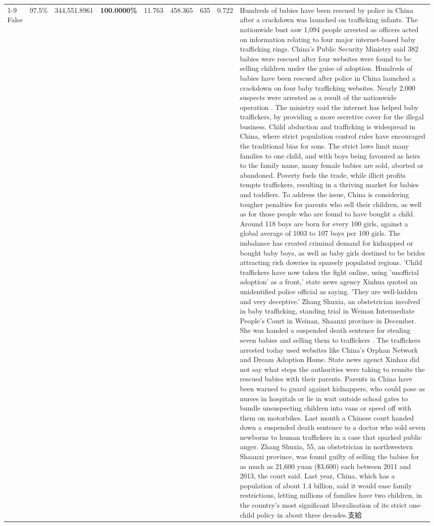 \begin{table}[H]
\begin{tabular}{lllrlllll}
\cline{1-9}
False & 97.5\% & 344,551.8961 & \bfseries \color{red} 100.0000\% & 11.763 & 458.365 & 635 & 0.722 & Hundreds of babies have been rescued by police in China after a crackdown was launched on trafficking infants. The nationwide bust saw 1,094 people arrested as officers acted on information relating to four major internet-based baby trafficking rings. China's Public Security Ministry said 382 babies were rescued after four websites were found to be selling children under the guise of adoption. Hundreds of babies have been rescued after police in China launched a crackdown on four baby trafficking websites. Nearly 2,000 suspects were arrested as a result of the nationwide operation . The ministry said the internet has helped baby traffickers, by providing a more secretive cover for the illegal business. Child abduction and trafficking is widespread in China, where strict population control rules have encouraged the traditional bias for sons. The strict laws limit many families to one child, and with boys being favoured as heirs to the family name, many female babies are sold, aborted or abandoned. Poverty fuels the trade, while illicit profits tempts traffickers, resulting in a thriving market for babies and toddlers. To address the issue, China is considering tougher penalties for parents who sell their children, as well as for those people who are found to have bought a child. Around 118 boys are born for every 100 girls, against a global average of 1003 to 107 boys per 100 girls. The imbalance has created criminal demand for kidnapped or bought baby boys, as well as baby girls destined to be brides attracting rich dowries in sparsely populated regions. 'Child traffickers have now taken the fight online, using 'unofficial adoption' as a front,' state news agency Xinhua quoted an unidentified police official as saying. 'They are well-hidden and very deceptive.' Zhang Shuxia, an obstetrician involved in baby trafficking, standing trial in Weinan Intermediate People's Court in Weinan, Shaanxi province in December. She was handed a suspended death sentence for stealing seven babies and selling them to traffickers . The traffickers arrested today used websites like China's Orphan Network and Dream Adoption Home. State news agenct Xinhau did not say what steps the authorities were taking to reunite the rescued babies with their parents. Parents in China have been warned to guard against kidnappers, who could pose as nurses in hospitals or lie in wait outside school gates to bundle unsuspecting children into vans or speed off with them on motorbikes. Last month a Chinese court handed down a suspended death sentence to a doctor who sold seven newborns to human traffickers in a case that sparked public anger. Zhang Shuxia, 55, an obstetrician in northwestern Shaanxi province, was found guilty of selling the babies for as much as 21,600 yuan (\$3,600) each between 2011 and 2013, the court said. Last year, China, which has a population of about 1.4 billion, said it would ease family restrictions, letting millions of families have two children, in the country's most significant liberalisation of its strict one-child policy in about three decades.支給 \\

\end{tabular}
\end{table}
